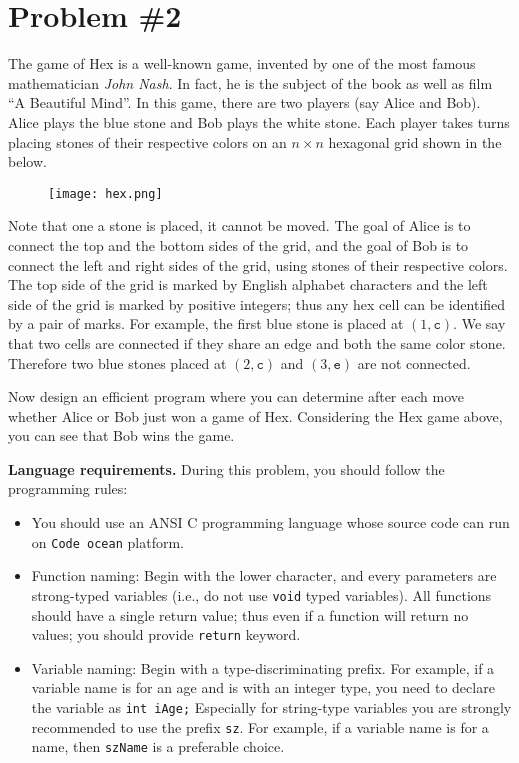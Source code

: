 \documentclass{article}
\begin{document}
\section{Problem \#2}
The game of \textsf{Hex} is a well-known game, invented by one of the most famous mathematician \textit{John Nash}.
In fact, he is the subject of the book as well as film ``A Beautiful Mind''. 
In this game, there are two players (say Alice and Bob). Alice plays the blue stone and Bob plays the white stone.
Each player takes turns placing stones of their respective colors on an $n\times n$ hexagonal grid shown in the below.
\begin{figure}[h]
\centering
\texttt{[image: hex.png]}
\end{figure}
Note that one a stone is placed, it cannot be moved.
The goal of Alice is to connect the top and the bottom sides of the grid,
and the goal of Bob is to connect the left and right sides of the grid,
using stones of their respective colors.
The top side of the grid is marked by English alphabet characters and the left side of the grid is 
marked by positive integers; thus any hex cell can be identified by a pair of marks.
For example, the first blue stone is placed at $(1,\mathtt{c})$. 
We say that two cells are connected if they share an  edge and both the same color stone.
Therefore two blue stones placed at $(2,\mathtt{c})$ and $(3,\mathtt{e})$ are not connected.

Now design an efficient program where you can determine after each move whether 
Alice or Bob just won a game of \textsf{Hex}. Considering the \textsf{Hex} game above, 
you can see that Bob wins the game.

\bigskip
\noindent\textbf{Language requirements. }%
During this problem, you should follow the programming rules:
\begin{itemize}
\item You should use an ANSI C programming language whose source code can run on \texttt{Code ocean} platform. 
\item Function naming: Begin with the lower character, and every parameters are strong-typed variables (i.e., do not use \texttt{void} typed variables).
	All functions should have a single return value; thus even if a function will return no values; you should provide \texttt{return} keyword.
\item Variable naming: Begin with a type-discriminating prefix. For example, if a variable name is for an age and is with an integer type,
	you need to declare the variable as \texttt{int iAge;}  Especially for string-type variables you are strongly recommended to use the prefix \texttt{sz}.
	For example, if a variable name is for a name, then \texttt{szName} is a preferable choice.
\end{itemize}
\end{document}
